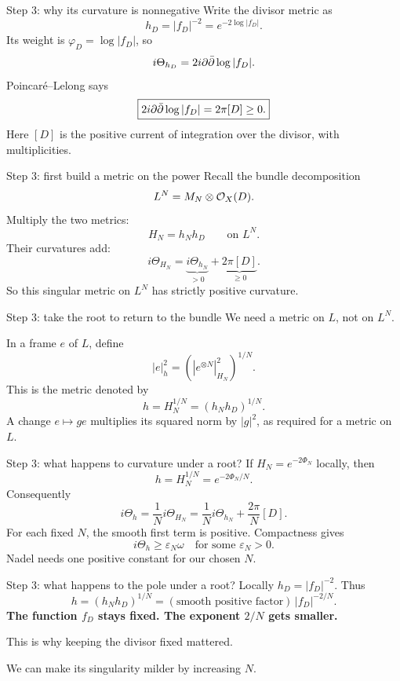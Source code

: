 \begin{frame}{Step 3: why its curvature is nonnegative}
Write the divisor metric as
\[
h_D=|f_D|^{-2}=e^{-2\log|f_D|}.
\]
Its weight is \(\varphi_D=\log|f_D|\), so
\[
i\Theta_{h_D}=2i\partial\bar\partial\log|f_D|.
\]
Poincaré--Lelong says
\[
\boxed{2i\partial\bar\partial\log|f_D|=2\pi[D]\ge0.}
\]
Here \([D]\) is the positive current of integration over the divisor, with multiplicities.
\end{frame}

\begin{frame}{Step 3: first build a metric on the power}
Recall the bundle decomposition
\[
L^N=M_N\otimes\mathcal O_X(D).
\]
Multiply the two metrics:
\[
H_N=h_Nh_D\qquad\text{on }L^N.
\]
Their curvatures add:
\[
i\Theta_{H_N}=\underbrace{i\Theta_{h_N}}_{>0}+\underbrace{2\pi[D]}_{\ge0}.
\]
So this singular metric on \(L^N\) has strictly positive curvature.
\end{frame}

\begin{frame}{Step 3: take the root to return to the bundle}
We need a metric on \(L\), not on \(L^N\).
\par\medskip
In a frame \(e\) of \(L\), define
\[
|e|_h^2=\left(|e^{\otimes N}|_{H_N}^2\right)^{1/N}.
\]
This is the metric denoted by
\[
\boxed{h=H_N^{1/N}=(h_Nh_D)^{1/N}.}
\]
A change \(e\mapsto ge\) multiplies its squared norm by \(|g|^2\), as required for a metric on \(L\).
\end{frame}

\begin{frame}{Step 3: what happens to curvature under a root?}
If \(H_N=e^{-2\Phi_N}\) locally, then
\[
h=H_N^{1/N}=e^{-2\Phi_N/N}.
\]
Consequently
\[
i\Theta_h=\frac1N i\Theta_{H_N}
=\frac1N i\Theta_{h_N}+\frac{2\pi}{N}[D].
\]
For each fixed \(N\), the smooth first term is positive. Compactness gives
\[
\boxed{i\Theta_h\ge\varepsilon_N\omega\quad\text{for some }\varepsilon_N>0.}
\]
Nadel needs one positive constant for our chosen \(N\).
\end{frame}

\begin{frame}{Step 3: what happens to the pole under a root?}
Locally \(h_D=|f_D|^{-2}\). Thus
\[
h=(h_Nh_D)^{1/N}
=(\text{smooth positive factor})\,|f_D|^{-2/N}.
\]
\textbf{The function \(f_D\) stays fixed. The exponent \(2/N\) gets smaller.}
\par\bigskip
This is why keeping the divisor fixed mattered.
\par\medskip
We can make its singularity milder by increasing \(N\).
\end{frame}


